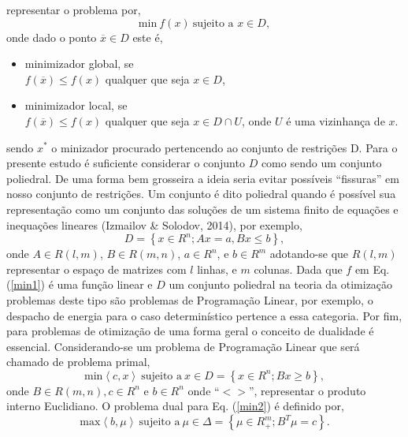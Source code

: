 \documentclass[12pt,fleqn]{article}
\begin{document}
representar o problema por,
\begin{equation}
  \text{min} \ f(x) \ \text{sujeito a $x \in D$},
  \label {min1}
\end{equation}
onde dado o ponto $\overline{x} \in D$ este \'e,
\begin{itemize}
  \item minimizador global, se \\
	$f(\overline{x}) \leq f(x) $ qualquer que seja $x \in D$, 
  \item minimizador local, se \\ 
	$f(\overline{x}) \leq f(x)$ qualquer que seja $x \in D \cap U$,
	onde $U$ \'e uma vizinhan\c ca de $x$.
\end{itemize}
sendo ${x}^{*}$  o minizador procurado pertencendo ao conjunto de restri\c
c\~oes D. Para o presente estudo \'e suficiente considerar o conjunto $D$ como sendo um conjunto poliedral. De uma forma bem grosseira a ideia seria evitar
poss\'iveis ``fissuras'' em nosso conjunto de restri\c c\~oes. Um conjunto  \'e dito poliedral quando \'e poss\'ivel sua representa\c c\~ao como um conjunto das solu\c c\~oes de um
sistema finito de equa\c c\~oes e inequa\c c\~oes lineares (Izmailov \& Solodov, 2014), por exemplo,
\begin{equation*}
  D = \left\{ x \in {R}^{n}; Ax = a, Bx \leq b\right\},
\end{equation*}
onde $A \in R(l,m)$, $B \in R(m,n)$, $a \in {R}^{n}$, e $b \in {R}^{m}$ adotando-se que $R(l,m)$ representar o
espa\c co de matrizes com $l$ linhas, e $m$ colunas. Dada que $f$ em Eq.(\ref {min1}) \'e uma fun\c c\~ao linear e $D$ um conjunto
poliedral na teoria da otimiza\c c\~ao problemas deste tipo s\~ao problemas de Programa\c c\~ao Linear, por exemplo, o despacho de energia
para o caso determin\'istico pertence a essa categoria. Por fim, para problemas de otimiza\c c\~ao de uma forma geral o conceito de dualidade \'e
essencial. Considerando-se um problema de Programa\c c\~ao Linear que ser\'a chamado de problema primal,
\begin{equation}
  \text{min} \left < c,x \right > \ \text{sujeito a} \ x \in D = \left\{ x \in {R}^{n}; Bx \geq b \right\}, 
  \label{min2}
\end{equation}
onde $B \in R(m,n), c \in {R}^{n}$ e $b \in {R}^{n}$ onde ``$< >$'', representar o produto interno Euclidiano.
O problema dual para Eq. (\ref{min2}) \'e definido por,
\begin{equation}
  \text{max} \left < b, \mu \right > \ \text{sujeito a} \ \mu \in \Delta = \left\{ \mu \in R_+^m;
  {B}^{T} \mu = c \right\}.
\end{equation}
\end{document}
